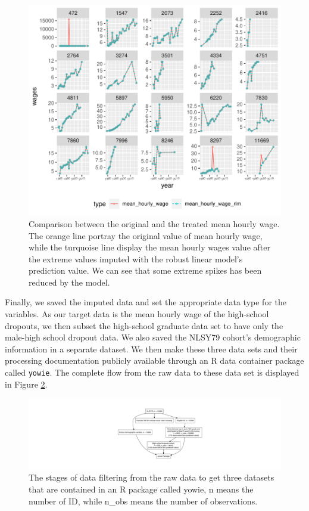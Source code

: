 \documentclass{article}
\begin{document}
\begin{figure}
\centering
\includegraphics{figures/compare-plot-1.pdf}
\caption{\label{fig:compare-plot}Comparison between the original and the treated mean hourly wage. The orange line portray the original value of mean hourly wage, while the turquoise line display the mean hourly wages value after the extreme values imputed with the robust linear model's prediction value. We can see that some extreme spikes has been reduced by the model.}
\end{figure}

Finally, we saved the imputed data and set the appropriate data type for the variables. As our target data is the mean hourly wage of the high-school dropouts, we then subset the high-school graduate data set to have only the male-high school dropout data. We also saved the NLSY79 cohort's demographic information in a separate dataset. We then make these three data sets and their processing documentation publicly available through an R data container package called \texttt{yowie}. The complete flow from the raw data to these data set is displayed in Figure \ref{fig:flow-chart}.

\begin{figure}
\centering
\includegraphics{figures/flow-chart-1.pdf}
\caption{\label{fig:flow-chart}The stages of data filtering from the raw data to get three datasets that are contained in an R package called yowie, n means the number of ID, while n\_obs means the number of observations.}
\end{figure}
\end{document}
